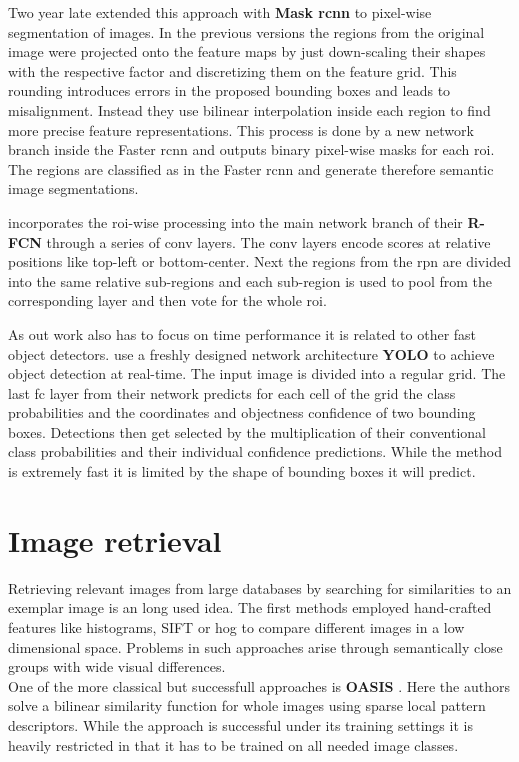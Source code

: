 Two year late \citet{he_mask_2017} extended this approach with \textbf{Mask \gls{rcnn}} to pixel-wise segmentation of images. In the previous versions the regions from the original image were projected onto the feature maps by just down-scaling their shapes with the respective factor and discretizing them on the feature grid. This rounding introduces errors in the proposed bounding boxes and leads to misalignment. Instead they use bilinear interpolation inside each region to find more precise feature representations. This process is done by a new network branch inside the Faster \gls{rcnn} and outputs binary pixel-wise masks for each \gls{roi}. The regions are classified as in the Faster \gls{rcnn} and generate therefore semantic image segmentations.

\citet{dai_r-fcn:_2016} incorporates the \gls{roi}-wise processing into the main network branch of their \textbf{R-FCN} through a series of \gls{conv} layers. The \gls{conv} layers encode scores at relative positions like top-left or bottom-center. Next the regions from the \gls{rpn} are divided into the same relative sub-regions and each sub-region is used to pool from the corresponding layer and then vote for the whole \gls{roi}.

As out work also has to focus on time performance it is related to other fast object detectors. \citet{redmon_you_2016} use a freshly designed network architecture \textbf{YOLO} to achieve object detection at real-time. The input image is divided into a regular grid. The last \gls{fc} layer from their network predicts for each cell of the grid the class probabilities and the coordinates and objectness confidence of two bounding boxes. Detections then get selected by the multiplication of their conventional class probabilities and their individual confidence predictions. While the method is extremely fast it is limited by the shape of bounding boxes it will predict.
\clearpage
\section{Image retrieval}
\label{sec:related:retrieval}
Retrieving relevant images from large databases by searching for similarities to an exemplar image is an long used idea. The first methods employed hand-crafted features like histograms, SIFT or \gls{hog} to compare different images in a low dimensional space. Problems in such approaches arise through semantically close groups with wide visual differences.\\
One of the more classical but successfull approaches is \textbf{OASIS} \citep{chechik_large_2010}. Here the authors solve a bilinear similarity function for whole images using sparse local pattern descriptors. While the approach is successful under its training settings it is heavily restricted in that it has to be trained on all needed image classes.

